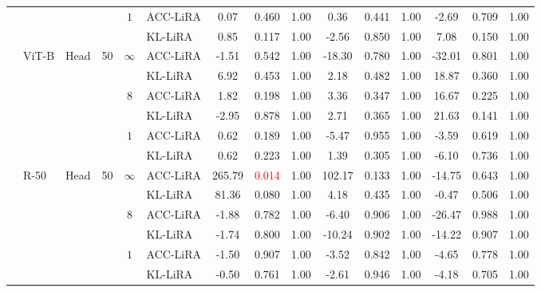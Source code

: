 \begin{table*}[!htb]
\begin{center}
{\begin{tabular}{lllrclccccccccc}
\cmidrule{5-15}
 &  &  &  & \multirow{2}{*}{$1$} & ACC-LiRA & 0.07 & 0.460 & 1.00 & 0.36 & 0.441 & 1.00 & -2.69 & 0.709 & 1.00 \\
 &  &  &  &  & KL-LiRA & 0.85 & 0.117 & 1.00 & -2.56 & 0.850 & 1.00 & 7.08 & 0.150 & 1.00 \\
\cmidrule{2-15}
 &  \multirow{6}{*}{ViT-B} & \multirow{6}{*}{Head} & \multirow{6}{*}{50} &\multirow{2}{*}{$\infty$}& ACC-LiRA & -1.51 & 0.542 & 1.00 & -18.30 & 0.780 & 1.00 & -32.01 & 0.801 & 1.00 \\
 &  &  &  & & KL-LiRA & 6.92 & 0.453 & 1.00 & 2.18 & 0.482 & 1.00 & 18.87 & 0.360 & 1.00 \\
\cmidrule{5-15}
 &  &  &  & \multirow{2}{*}{$8$} & ACC-LiRA & 1.82 & 0.198 & 1.00 & 3.36 & 0.347 & 1.00 & 16.67 & 0.225 & 1.00 \\
 &  &  &  &  & KL-LiRA & -2.95 & 0.878 & 1.00 & 2.71 & 0.365 & 1.00 & 21.63 & 0.141 & 1.00 \\
\cmidrule{5-15}
 &  &  &  & \multirow{2}{*}{$1$} & ACC-LiRA & 0.62 & 0.189 & 1.00 & -5.47 & 0.955 & 1.00 & -3.59 & 0.619 & 1.00 \\
 &  &  &  &  & KL-LiRA & 0.62 & 0.223 & 1.00 & 1.39 & 0.305 & 1.00 & -6.10 & 0.736 & 1.00 \\

\cmidrule{2-15}
 & \multirow{6}{*}{R-50} & \multirow{6}{*}{Head} & \multirow{6}{*}{50} &\multirow{2}{*}{$\infty$} & ACC-LiRA & 265.79 & \textcolor{red}{0.014} & 1.00 & 102.17 & 0.133 & 1.00 & -14.75 & 0.643 & 1.00 \\
 &  &  &  & & KL-LiRA & 81.36 & 0.080 & 1.00 & 4.18 & 0.435 & 1.00 & -0.47 & 0.506 & 1.00 \\
\cmidrule{5-15}
 &  &  &  & \multirow{2}{*}{$8$} & ACC-LiRA & -1.88 & 0.782 & 1.00 & -6.40 & 0.906 & 1.00 & -26.47 & 0.988 & 1.00 \\
 &  &  &  &  & KL-LiRA & -1.74 & 0.800 & 1.00 & -10.24 & 0.902 & 1.00 & -14.22 & 0.907 & 1.00 \\
\cmidrule{5-15}
 &  &  &  & \multirow{2}{*}{$1$} & ACC-LiRA & -1.50 & 0.907 & 1.00 & -3.52 & 0.842 & 1.00 & -4.65 & 0.778 & 1.00 \\
 &  &  &  &  & KL-LiRA & -0.50 & 0.761 & 1.00 & -2.61 & 0.946 & 1.00 & -4.18 & 0.705 & 1.00 \\


\end{tabular}}
\end{center}
\end{table*}
